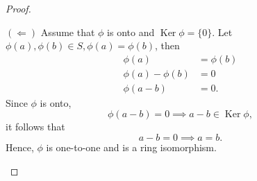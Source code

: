 \documentclass{article}
\theoremstyle{definition}
\DeclareMathOperator{\Ker}{Ker}
\begin{document}
\begin{proof}
\begin{enumerate}
         $(\Leftarrow)$ Assume that $\phi$ is onto and $\Ker\phi=\{0\}$. Let $\phi(a),\phi(b)\in S, \phi(a)=\phi(b)$, then
         \begin{align*}
             \phi(a)&=\phi(b) \\
             \phi(a)-\phi(b)&=0 \\
             \phi(a-b)&=0.
         \end{align*}
         Since $\phi$ is onto,
         \begin{equation*}
             \phi(a-b)=0 \implies a-b \in \Ker\phi,
         \end{equation*}
         it follows that
         \begin{equation*}
             a-b=0 \implies a=b.
         \end{equation*}
         Hence, $\phi$ is one-to-one and is a ring isomorphism.
         

\end{enumerate}
\end{proof}
\end{document}
